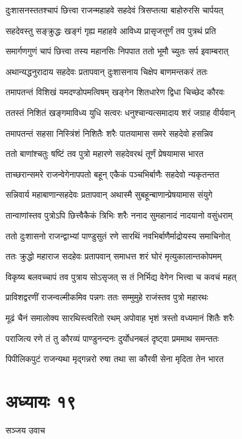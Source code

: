 \twolineshloka
{दुःशासनस्ततश्चापं छित्त्वा राजन्महाहवे}
{सहदेवं त्रिसप्तत्या बाहोरुरसि चार्पयत्}


\twolineshloka
{सहदेवस्तु सङ्क्रुद्धः खङ्गं गृह्य महाहवे}
{आविध्य प्रासृजत्तूर्णं तव पुत्रथं प्रति}


\twolineshloka
{समार्गणगुणं चापं छित्त्वा तस्य महानसिः}
{निपपात ततो भूमौ च्युतः सर्प इवाम्बरात्}


\twolineshloka
{अथान्यद्धनुरादाय सहदेवः प्रतापवान्}
{दुःशासनाय चिक्षेप बाणमन्तकरं ततः}


\twolineshloka
{तमापतन्तं विशिखं यमदण्डोपमत्विषम्}
{खङ्गेन शितधारेण द्विधा चिच्छेद कौरवः}


\twolineshloka
{ततस्तं निशितं खङ्गमाविध्य युधि सत्वरः}
{धनुश्चान्यत्समादाय शरं जग्राह वीर्यवान्}


\twolineshloka
{तमापतन्तं सहसा निस्त्रिंशं निशितैः शरैः}
{पातयामास समरे सहदेवो हसन्निव}


\twolineshloka
{ततो बाणांश्चतुः षष्टिं तव पुत्रो महारणे}
{सहदेवरथं तूर्णं प्रेषयामास भारत}


\twolineshloka
{ताच्छरान्समरे राजन्वेगेनापपतो बहून्}
{एकैकं पञ्चभिर्बाणैः सहदेवो न्यकृतन्तत}


\twolineshloka
{सन्निवार्य महाबाणान्सहदेवः प्रतापवान्}
{अथास्मै सुबहून्बाणान्प्रेषयामास संयुगे}


\twolineshloka
{तान्वाणांस्तव पुत्रोऽपि छित्त्वैकैकं त्रिभिः शरैः}
{ननाद सुमहानादं नादयानो वसुंधराम्}


\twolineshloka
{ततो दुःशासनो राजन्द्वाभ्यां पाण्डुसुतं रणे}
{सारथिं नवभिर्बाणैर्माद्रोयस्य समाचिनोत्}


\twolineshloka
{ततः क्रुद्धो महाराज सदहेवः प्रतापवान्}
{समाधत्त शरं घोरं मृत्युकालान्तकोपमम्}


\twolineshloka
{विकृष्य बलवच्चापं तव पुत्राय सोऽसृजत्}
{स तं निर्भिद्य वेगेन भित्त्वा च कवचं महत्}


\twolineshloka
{प्राविशद्वरणीं राजन्वल्मीकमिव पन्नगः}
{ततः सम्मुमुहे राजंस्तव पुत्रो महारथः}


\twolineshloka
{मूढं चैनं समालोक्य सारथिस्त्वरितो रथम्}
{अपोवाह भृशं त्रस्तो वध्यमानं शितैः शरैः}


\twolineshloka
{पराजित्य रणे तं तु कौरव्यं पाण्डुनन्दनः}
{दुर्योधनबलं दृष्ट्वा प्रममाथ समन्ततः}


\twolineshloka
{पिपीलिकपुटं राजन्यथा मृद्गन्नरो रुषा}
{तथा सा कौरवी सेना मृदिता तेन भारत}


\chapter{अध्यायः १९}
\twolineshloka
{सञ्जय उवाच}
{}


